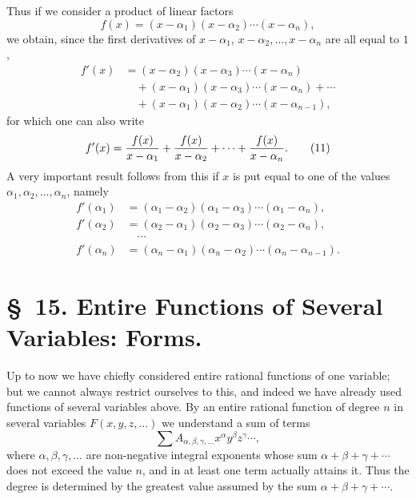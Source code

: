 \documentclass[11pt]{article}
\begin{document}
Thus if we consider a product of linear factors
\begin{equation}
 f(x)=(x-\alpha_1)(x-\alpha_2)\cdots(x-\alpha_n),
\tag{9}
\end{equation}
we obtain, since the first derivatives of $x-\alpha_1$, $x-\alpha_2,\ldots,x-\alpha_n$ are all equal to $1$,
\begin{equation}
\begin{aligned}
f'(x)&=(x-\alpha_2)(x-\alpha_3)\cdots(x-\alpha_n)\\
&\quad +(x-\alpha_1)(x-\alpha_3)\cdots(x-\alpha_n)+\cdots\\
&\quad +(x-\alpha_1)(x-\alpha_2)\cdots(x-\alpha_{n-1}),
\end{aligned}
\tag{10}
\end{equation}
for which one can also write
\begin{equation}
 f'(x)={f(x)\over x-\alpha_1}+{f(x)\over x-\alpha_2}+\cdots+{f(x)\over x-\alpha_n}.
\tag{11}
\end{equation}
A very important result follows from this if $x$ is put equal to one of the values $\alpha_1,\alpha_2,\ldots,\alpha_n$, namely
\begin{equation}
\begin{aligned}
 f'(\alpha_1)&=(\alpha_1-\alpha_2)(\alpha_1-\alpha_3)\cdots(\alpha_1-\alpha_n),\\
 f'(\alpha_2)&=(\alpha_2-\alpha_1)(\alpha_2-\alpha_3)\cdots(\alpha_2-\alpha_n),\\
 &\quad\cdots\\
 f'(\alpha_n)&=(\alpha_n-\alpha_1)(\alpha_n-\alpha_2)\cdots(\alpha_n-\alpha_{n-1}).
\end{aligned}
\tag{12}
\end{equation}

\section*{\S~15. Entire Functions of Several Variables: Forms.}

Up to now we have chiefly considered entire rational functions of one variable; but we cannot always restrict ourselves to this, and indeed we have already used functions of several variables above. By an entire rational function of degree $n$ in several variables $F(x,y,z,\ldots)$ we understand a sum of terms
\[
 \sum A_{\alpha,\beta,\gamma,\ldots}x^\alpha y^\beta z^\gamma\cdots,
\]
where $\alpha,\beta,\gamma,\ldots$ are non-negative integral exponents whose sum $\alpha+\beta+\gamma+\cdots$ does not exceed the value $n$, and in at least one term actually attains it. Thus the degree is determined by the greatest value assumed by the sum $\alpha+\beta+\gamma+\cdots$.
\end{document}
